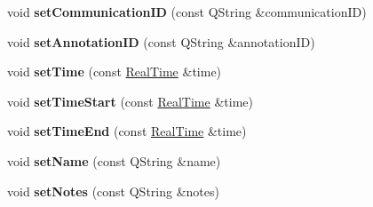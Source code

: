 \begin{DoxyCompactItemize}
\item 
\mbox{\label{class_corpus_bookmark_ac9764093eb21f8e313cb045fea780f34}} 
void {\bfseries set\+Communication\+ID} (const Q\+String \&communication\+ID)
\item 
\mbox{\label{class_corpus_bookmark_aab4088d18eba6a84819de85782191ae9}} 
void {\bfseries set\+Annotation\+ID} (const Q\+String \&annotation\+ID)
\item 
\mbox{\label{class_corpus_bookmark_a2dd7eda8d14ba802a6d72a1a576697c8}} 
void {\bfseries set\+Time} (const \hyperlink{struct_real_time}{Real\+Time} \&time)
\item 
\mbox{\label{class_corpus_bookmark_aadac021e43a7fa7fafcf3c2755262515}} 
void {\bfseries set\+Time\+Start} (const \hyperlink{struct_real_time}{Real\+Time} \&time)
\item 
\mbox{\label{class_corpus_bookmark_a9ee7cf32bd88144ad59b4292f77e8f62}} 
void {\bfseries set\+Time\+End} (const \hyperlink{struct_real_time}{Real\+Time} \&time)
\item 
\mbox{\label{class_corpus_bookmark_a5cd2426e1e4ee516b1bc80f2f156b2b4}} 
void {\bfseries set\+Name} (const Q\+String \&name)
\item 
\mbox{\label{class_corpus_bookmark_aeca7505dd6c54733ac12aaeb9a373871}} 
void {\bfseries set\+Notes} (const Q\+String \&notes)
\end{DoxyCompactItemize}
